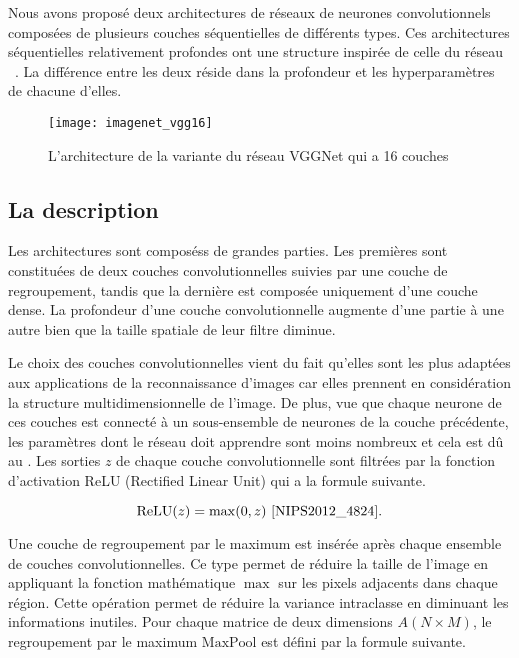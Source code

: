 Nous avons proposé deux architectures de réseaux de neurones convolutionnels composées
de plusieurs couches séquentielles de différents types. Ces architectures
séquentielles relativement profondes ont une structure inspirée de celle du
réseau ~\cite{simonyan2014very}. La différence entre les deux
réside dans la profondeur et les hyperparamètres de chacune d'elles.

\begin{figure}[h]
\begin{center}
\texttt{[image: imagenet\_vgg16]}
\caption[L'architecture de la variante du réseau VGGNet qui a 16 couches]
{L'architecture de la variante du réseau VGGNet qui a 16 couches~\cite{blier2016abrief}}
\end{center}
\end{figure}

\subsection{La description}

Les architectures sont composéss de grandes parties. Les premières sont
constituées de deux couches convolutionnelles suivies par une couche de regroupement,
tandis que la dernière est composée uniquement d'une couche dense. La
profondeur d'une couche convolutionnelle augmente d'une partie à une autre
bien que la taille spatiale de leur filtre diminue.

Le choix des couches convolutionnelles vient du fait qu'elles sont les plus
adaptées aux applications de la reconnaissance d'images car elles prennent en
considération la structure multidimensionnelle de l'image. De plus, vue que
chaque neurone de ces couches est connecté à un sous-ensemble de neurones de la
couche précédente, les paramètres dont le réseau doit apprendre sont moins nombreux et cela
est dû au . Les sorties $z$ de chaque couche
convolutionnelle sont filtrées par la fonction d'activation ReLU (Rectified Linear Unit)
qui a la formule suivante.

$$
\mathrm{ReLU}(z) = \max(0,z)~\cite{NIPS2012_4824}.
$$

Une couche de regroupement par le maximum est insérée après chaque ensemble de couches
convolutionnelles. Ce type permet de réduire la taille de l'image en appliquant
la fonction mathématique $\max$ sur les pixels adjacents dans chaque région. Cette
opération permet de réduire la variance intraclasse en diminuant les informations
inutiles. Pour chaque matrice de deux dimensions $A(N \times M)$, le regroupement
par le maximum $\mathrm{MaxPool}$ est défini par la formule suivante.


